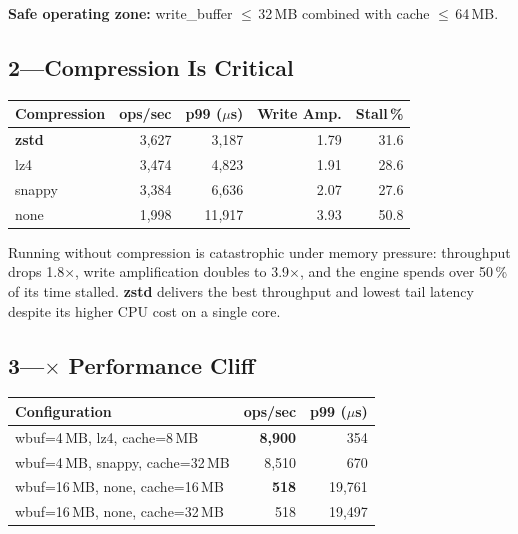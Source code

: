 \documentclass[10pt,a4paper]{scrartcl}
\begin{document}
\medskip
\textbf{Safe operating zone:} write\_buffer $\leq$\,32\,MB combined with cache $\leq$\,64\,MB.

\subsection{2\enspace---\enspace Compression Is Critical}

\begin{tabular}{lrrrr}
  \toprule
  \textbf{Compression} & \textbf{ops/sec} & \textbf{p99 ($\mu$s)} & \textbf{Write Amp.} & \textbf{Stall\,\%} \\
  \midrule
  \rowcolor{goodrow} \textbf{zstd}   & 3{,}627 & 3{,}187  & 1.79 & 31.6 \\
  \rowcolor{goodrow} lz4             & 3{,}474 & 4{,}823  & 1.91 & 28.6 \\
  snappy                             & 3{,}384 & 6{,}636  & 2.07 & 27.6 \\
  \rowcolor{badrow}  none            & 1{,}998 & 11{,}917 & 3.93 & 50.8 \\
  \bottomrule
\end{tabular}

\smallskip
Running without compression is catastrophic under memory pressure: throughput
drops 1.8$\times$, write amplification doubles to 3.9$\times$, and the engine
spends over 50\,\% of its time stalled. \textbf{zstd} delivers the best
throughput and lowest tail latency despite its higher CPU cost on a single core.

\subsection{3\enspace---$\times$ Performance Cliff}

\begin{tabular}{lrr}
  \toprule
  \textbf{Configuration} & \textbf{ops/sec} & \textbf{p99 ($\mu$s)} \\
  \midrule
  \rowcolor{goodrow} wbuf=4\,MB, lz4, cache=8\,MB    & \textbf{8{,}900} & 354 \\
  \rowcolor{goodrow} wbuf=4\,MB, snappy, cache=32\,MB & 8{,}510          & 670 \\
  \rowcolor{badrow}  wbuf=16\,MB, none, cache=16\,MB  & \textbf{518}     & 19{,}761 \\
  \rowcolor{badrow}  wbuf=16\,MB, none, cache=32\,MB  & 518              & 19{,}497 \\
  \bottomrule
\end{tabular}
\end{document}

